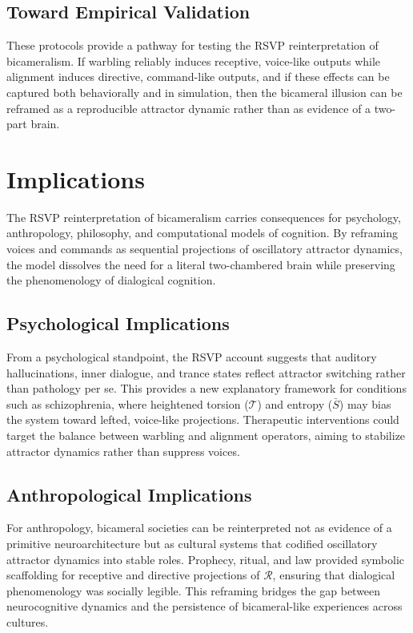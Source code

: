 \documentclass[a4paper,11pt]{article}
\begin{document}
\subsection{Toward Empirical Validation}
These protocols provide a pathway for testing the RSVP reinterpretation of
bicameralism. If warbling reliably induces receptive, voice-like outputs while
alignment induces directive, command-like outputs, and if these effects can be
captured both behaviorally and in simulation, then the bicameral illusion can be
reframed as a reproducible attractor dynamic rather than as evidence of a
two-part brain.

\section{Implications}
\label{sec:implications}

The RSVP reinterpretation of bicameralism carries consequences for psychology,
anthropology, philosophy, and computational models of cognition. By reframing
voices and commands as sequential projections of oscillatory attractor
dynamics, the model dissolves the need for a literal two-chambered brain while
preserving the phenomenology of dialogical cognition.

\subsection{Psychological Implications}
From a psychological standpoint, the RSVP account suggests that auditory
hallucinations, inner dialogue, and trance states reflect attractor switching
rather than pathology per se. This provides a new explanatory framework for
conditions such as schizophrenia, where heightened torsion ($\mathcal{T}$) and
entropy ($\bar{S}$) may bias the system toward lefted, voice-like projections.
Therapeutic interventions could target the balance between warbling and
alignment operators, aiming to stabilize attractor dynamics rather than
suppress voices.

\subsection{Anthropological Implications}
For anthropology, bicameral societies can be reinterpreted not as evidence of a
primitive neuroarchitecture but as cultural systems that codified oscillatory
attractor dynamics into stable roles. Prophecy, ritual, and law provided
symbolic scaffolding for receptive and directive projections of $\mathcal{R}$,
ensuring that dialogical phenomenology was socially legible. This reframing
bridges the gap between neurocognitive dynamics and the persistence of
bicameral-like experiences across cultures.
\end{document}
